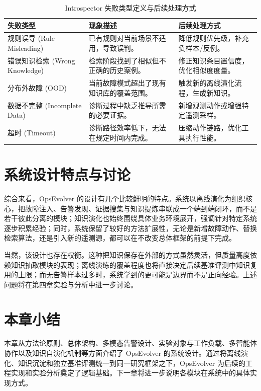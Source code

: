 \begin{table}[htbp]
    \centering
    \caption{Introspector 失败类型定义与后续处理方式}
    \label{tab:failure-analysis}
    \small
    \begin{tabular}{>{\centering\arraybackslash}m{5.4cm}>{\centering\arraybackslash}m{3.8cm}>{\centering\arraybackslash}m{3.8cm}}
        \toprule
        \textbf{失败类型} & \textbf{现象描述} & \textbf{后续处理方式} \\
        \midrule
        规则误导 (Rule Misleading) & 已有规则对当前场景不适用，导致误判。 & 降低规则优先级，补充负样本/反例。 \\
        错误知识检索 (Wrong Knowledge) & 检索阶段找到了相似但不正确的历史案例。 & 修正知识条目置信度，优化相似度度量。 \\
        分布外故障 (OOD) & 当前故障模式超出了现有知识库的覆盖范围。 & 触发新的离线演化流程，生成新知识。 \\
        数据不完整 (Incomplete Data) & 诊断过程中缺乏推导所需的必要证据。 & 新增观测动作或增强特定遥测采样。 \\
        超时 (Timeout) & 诊断路径效率低下，无法在规定时间内完成。 & 压缩动作链路，优化工具执行性能。 \\
        \bottomrule
    \end{tabular}
\end{table}

\section{系统设计特点与讨论}
\label{sec:design_discussion}

综合来看，OpsEvolver 的设计有几个比较鲜明的特点。系统以离线演化为组织核心，把故障注入、告警发现、证据搜集与知识提炼串联成一个端到端闭环，而不是若干彼此分离的模块；知识演化也始终围绕具体业务环境展开，强调针对特定系统逐步积累经验；同时，系统保留了较好的方法扩展性，无论是新增故障动作、替换检索算法，还是引入新的遥测源，都可以在不改变总体框架的前提下完成。

当然，该设计也存在权衡。这种把知识保存在外部的方式虽然灵活，但质量高度依赖知识抽取模块的表现；离线演练的覆盖程度也将直接决定后续基准评测中知识复用的上限；而无告警样本过多时，系统学到的更可能是边界而不是正向经验。上述问题将在第四章实验与分析中进一步讨论。

\section{本章小结}
\label{sec:chap02_summary}

本章从方法论原则、总体架构、多模态告警设计、实验对象与工作负载、多智能体协作以及知识自演化机制等方面介绍了 OpsEvolver 的系统设计。通过将离线演化、知识沉淀和独立基准评测统一到同一研究框架之下，OpsEvolver 为后续的工程实现和实验分析奠定了逻辑基础。下一章将进一步说明各模块在系统中的具体实现方式。
